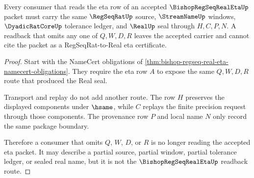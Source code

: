\begin{theorem}
\label{thm:bishop-regseq-real-eta-readback-nonescape}
Every consumer that reads the eta row of an accepted $\BishopRegSeqRealEtaUp$ packet must carry the same $\RegSeqRatUp$ source, $\StreamNameUp$ windows, $\DyadicRatCoreUp$ tolerance ledger, and $\RealUp$ seal through $H,C,P,N$. A readback that omits any one of $Q,W,D,R$ leaves the accepted carrier and cannot cite the packet as a RegSeqRat-to-Real eta certificate.
\end{theorem}
\begin{proof}
Start with the NameCert obligations of \autoref{thm:bishop-regseq-real-eta-namecert-obligations}. They require the eta row $A$ to expose the same $Q,W,D,R$ route that produced the Real seal.

Transport and replay do not add another route. The row $H$ preserves the displayed components under $\hsame$, while $C$ replays the finite precision request through those components. The provenance row $P$ and local name $N$ only record the same package boundary.

Therefore a consumer that omits $Q$, $W$, $D$, or $R$ is no longer reading the accepted eta packet. It may describe a partial source, partial window, partial tolerance ledger, or sealed real name, but it is not the $\BishopRegSeqRealEtaUp$ readback route.
\end{proof}





